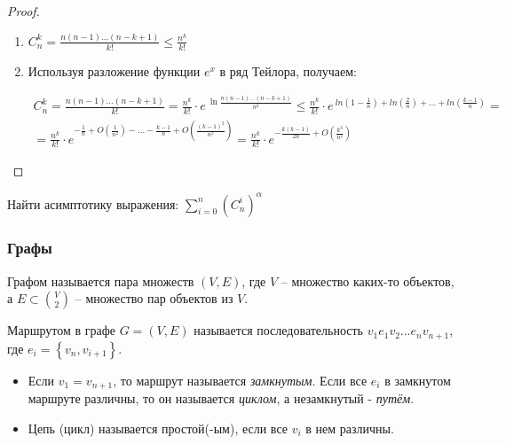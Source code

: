 \begin{proof}
	\begin{enumerate}
		
		\item $C_{n}^{k}=\frac{n(n-1) \ldots(n-k+1)}{k !} \leqslant \frac{n^{k}}{k !} $
		\item Используя разложение функции $e^x$ в ряд Тейлора, получаем:
		
		\begin{eqnarray*}
		C_{n}^{k}=\frac{n(n-1) \ldots(n-k+1)}{k !}=\frac{n^{k}}{k!} \cdot e^{\:\ln \frac{n(n-1) \ldots(n-k+1)}{n^{k}}} \leqslant
		\frac{n^{k}}{k !} \cdot e^{\:ln(1 - \frac{1}{n}) + ln(\frac{2}{n})+\ldots+ln(\frac{k-1}{n})} = \\
		=\frac{n^{k}}{k!} \cdot e^{-\frac{1}{n} + O\left( \frac{1}{n^2}\right)  - \ldots  - \frac{k-1}{n} + O\left( \frac{( k-1)^2}{n^2}\right) } = \frac{n^{k}}{k!} \cdot e^{-\frac{k(k-1)}{2n} + O\left( \frac{k^3}{n^2}\right) }
		\end{eqnarray*}
		
	\end{enumerate}
\end{proof}

\begin{brainer}
	Найти асимптотику выражения:  $ \sum_{i = 0}^{n} \left( C_{n}^{i}\right)^\alpha $
\end{brainer}


\subsubsection{Графы}

\begin{Def}
	Графом называется пара множеств $(V, E)$, где $V$ -- множество каких-то
	объектов, а $E \subset \binom{V}{2}$ -- множество пар объектов из $V$.
\end{Def} 


\begin{Def}
	Маршрутом в графе $G=(V, E)$ называется последовательность $v_{1} e_{1} v_{2} \ldots e_{n} v_{n+1}$, где $e_i = \left\lbrace v_{n}, v_{i+1} \right\rbrace $.
	
	\begin{itemize}
		\item Если $v_{1}=v_{n+1}$, то маршрут называется \emph{замкнутым}.
		Если все $e_{i}$ в замкнутом маршруте различны, то он называется \emph{циклом}, а незамкнутый - \emph{путём}.
		\item Цепь (цикл) называется простой(-ым), если все $v_i$ в нем различны.
	\end{itemize}
\end{Def} 

